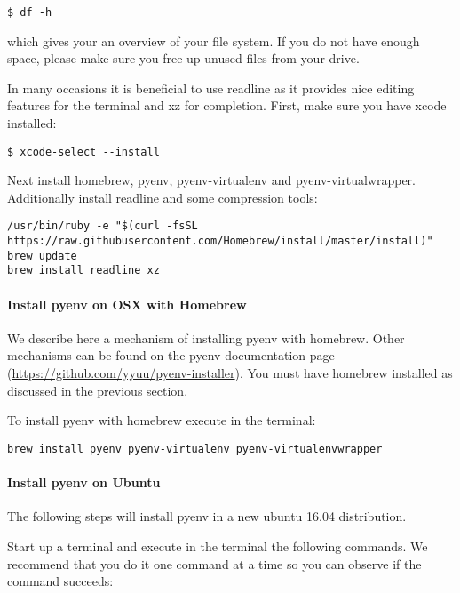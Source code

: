 \begin{verbatim}
$ df -h
\end{verbatim}

which gives your an overview of your file system. If you do not have
enough space, please make sure you free up unused files from your drive.

In many occasions it is beneficial to use readline as it provides nice
editing features for the terminal and xz for completion. First, make
sure you have xcode installed:

\begin{verbatim}
$ xcode-select --install
\end{verbatim}

Next install homebrew, pyenv, pyenv-virtualenv and pyenv-virtualwrapper.
Additionally install readline and some compression tools:

\begin{verbatim}
/usr/bin/ruby -e "$(curl -fsSL https://raw.githubusercontent.com/Homebrew/install/master/install)"
brew update
brew install readline xz
\end{verbatim}

\paragraph{Install pyenv on OSX with
Homebrew}\label{install-pyenv-on-osx-with-homebrew}

We describe here a mechanism of installing pyenv with homebrew. Other
mechanisms can be found on the pyenv documentation page
(\url{https://github.com/yyuu/pyenv-installer}). You must have homebrew
installed as discussed in the previous section.

To install pyenv with homebrew execute in the terminal:

\begin{verbatim}
brew install pyenv pyenv-virtualenv pyenv-virtualenvwrapper
\end{verbatim}

\paragraph{Install pyenv on Ubuntu}\label{install-pyenv-on-ubuntu}

The following steps will install pyenv in a new ubuntu 16.04
distribution.

Start up a terminal and execute in the terminal the following commands.
We recommend that you do it one command at a time so you can observe if
the command succeeds:

